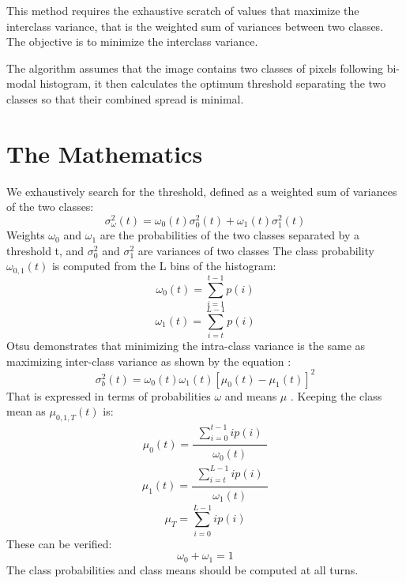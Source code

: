 \documentclass[BTech]{srmuthesis}
\begin{document}
This method requires the exhaustive scratch of values that maximize the interclass variance, that is the weighted sum of variances between two classes. The objective is to minimize the interclass variance.

The algorithm assumes that the image contains two classes of pixels following bi-modal histogram, it then calculates the optimum threshold separating the two classes so that their combined spread is minimal.

\section{The Mathematics}
We exhaustively search for the threshold, defined as a weighted sum of variances of the two classes:
\begin{equation}
\sigma^{2}_{\omega}(t) = \omega_{0}(t) \sigma^{2}_{0}(t) + \omega_{1}(t) \sigma^{2}_{1}(t) 
\end{equation}
Weights $\omega_{0}$   and  $\omega_{1}$ are the probabilities of the two classes separated by a threshold t, and  $\sigma^{2}_{0}$ and $\sigma^{2}_{1}$ are variances of two classes The class probability $\omega_{0,1}(t) $ is computed from the L bins of the histogram:
\begin{equation}
\omega_{0}(t) = \sum_{i=1}^{t-1} p(i)
\end{equation}
\begin{equation}
\omega_{1}(t) = \sum_{i=t}^{L-1} p(i)
\end{equation}
Otsu demonstrates that minimizing the intra-class variance is the same as maximizing inter-class variance as shown by the equation :
\begin{equation}
\sigma^{2}_{b}(t) = \omega_{0}(t) \omega_{1}(t) [\mu_{0}(t)-\mu_{1}(t)]^{2}
\end{equation}
That is expressed in terms of probabilities $\omega$ and means $\mu $ . Keeping the class mean as  $\mu_{0,1,T}(t)$ is:
\begin{equation}
\mu_{0}(t) = \frac  {\substack{\sum_{i=0}^{t-1} ip(i)}}
{\substack{\omega_{0}(t)}  }
\end{equation}
\begin{equation}
\mu_{1}(t) = \frac  {\substack{\sum_{i=t}^{L-1} ip(i)}}
{\substack{\omega_{1}(t)}  }
\end{equation}
\begin{equation}
\mu_{T} = \sum_{i=0}^{L-1} ip(i)
\end{equation}
These can be verified:
\begin{equation}
	\omega_{0} + \omega_{1} = 1
\end{equation}
The class probabilities and class 
means should be computed at all turns.
\end{document}

